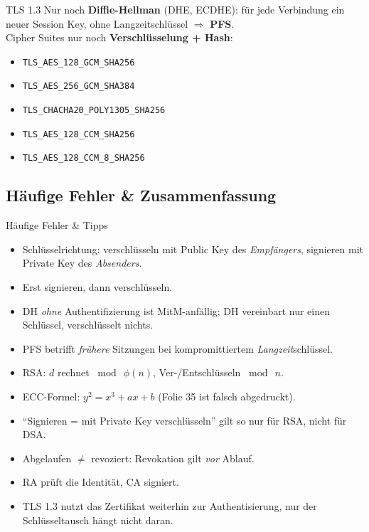 \documentclass[a4paper, fontsize=7pt]{scrartcl}
\begin{document}
\begin{mainbox}{TLS 1.3}
Nur noch \textbf{Diffie-Hellman} (DHE, ECDHE): für jede Verbindung ein neuer
Session Key, ohne Langzeitschlüssel $\Rightarrow$ \textbf{PFS}.\\
Cipher Suites nur noch \textbf{Verschlüsselung + Hash}:
\begin{itemize}
    \item \texttt{TLS\_AES\_128\_GCM\_SHA256}
    \item \texttt{TLS\_AES\_256\_GCM\_SHA384}
    \item \texttt{TLS\_CHACHA20\_POLY1305\_SHA256}
    \item \texttt{TLS\_AES\_128\_CCM\_SHA256}
    \item \texttt{TLS\_AES\_128\_CCM\_8\_SHA256}
\end{itemize}
\end{mainbox}

\subsection{Häufige Fehler \& Zusammenfassung}

\begin{subbox}{Häufige Fehler \& Tipps}
\begin{itemize}
    \item Schlüsselrichtung: verschlüsseln mit Public Key des \emph{Empfängers},
          signieren mit Private Key des \emph{Absenders}.
    \item Erst signieren, dann verschlüsseln.
    \item DH \emph{ohne} Authentifizierung ist MitM-anfällig; DH vereinbart nur
          einen Schlüssel, verschlüsselt nichts.
    \item PFS betrifft \emph{frühere} Sitzungen bei kompromittiertem
          \emph{Langzeit}schlüssel.
    \item RSA: $d$ rechnet $\bmod\ \phi(n)$, Ver-/Entschlüsseln $\bmod\ n$.
    \item ECC-Formel: $y^2 = x^3 + ax + b$ (Folie 35 ist falsch abgedruckt).
    \item ``Signieren = mit Private Key verschlüsseln'' gilt so nur für RSA,
          nicht für DSA.
    \item Abgelaufen $\neq$ revoziert: Revokation gilt \emph{vor} Ablauf.
    \item RA prüft die Identität, CA signiert.
    \item TLS 1.3 nutzt das Zertifikat weiterhin zur Authentisierung, nur der
          Schlüsseltausch hängt nicht daran.
\end{itemize}
\end{subbox}
\end{document}
